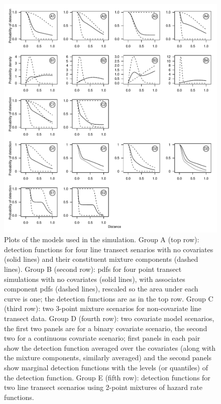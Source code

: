 \documentclass[useAMS,referee,usenatbib]{biom}
\begin{document}
\begin{figure}
\centering
\includegraphics[width=\textwidth]{figs/sim-detfct.pdf}
\caption{Plots of the models used in the simulation. Group A (top row): detection functions for four line transect senarios with no covariates (solid lines) and their constituent mixture components (dashed lines). Group B (second row): pdfs for four point transect simulations with no covariates (solid lines), with associates component pdfs (dashed lines), rescaled so the area under each curve is one; the detection functions are as in the top row. Group C (third row): two 3-point mixture scenarios for non-covariate line transect data. Group D (fourth row): two covariate model scenarios, the first two panels are for a binary covariate scenario, the second two for a continuous covariate scenario; first panels in each pair show the detection function averaged over the covariates (along with the mixture components, similarly averaged) and the second panels show marginal detection functions with the levels (or quantiles) of the detection function.  Group E (fifth row): detection functions for two line transect scenarios using 2-point mixtures of hazard rate functions.}
\label{sim-detfcts}
\end{figure}
\end{document}
